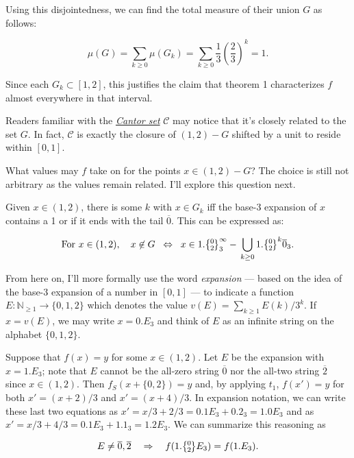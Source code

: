 \documentclass[20pt,]{extarticle}
\begin{document}
Using this disjointedness, we can find the total measure of their union
\(G\) as follows:

\[\mu(G) = \sum_{k \ge 0}\mu(G_k) = \sum_{k\ge 0}
\frac{1}{3}\left(\frac{2}{3}\right)^k = 1.\]

Since each \(G_k\subset [1,2]\), this justifies the claim that theorem 1
characterizes \(f\) almost everywhere in that interval.

\newcommand{\cantor}{\mathcal{C}}

Readers familiar with the
\href{https://en.wikipedia.org/wiki/Cantor_set}{\emph{Cantor set}}
\(\cantor\) may notice that it's closely related to the set \(G\). In
fact, \(\cantor\) is exactly the closure of \((1,2)-G\) shifted by a
unit to reside within \([0,1].\)

What values may \(f\) take on for the points \(x\in (1,2) - G\)? The
choice is still not arbitrary as the values remain related. I'll explore
this question next.

Given \(x\in (1,2)\), there is some \(k\) with \(x\in G_k\) iff the
base-3 expansion of \(x\) contains a 1 or if it ends with the tail
\(\overline{0}\). This can be expressed as:

\begin{equation}\text{For } x\in (1,2), \quad
  x\not\in G \;\;\Leftrightarrow\;\; x \in 1.\zerotwo^\infty_3 -\,
  \bigcup_{k\ge 0} 1.\zerotwo^k\overline{0}_3.\label{eq:onetwo_lessG}\end{equation}

From here on, I'll more formally use the word \emph{expansion} --- based
on the idea of the base-3 expansion of a number in \([0,1]\) --- to
indicate a function \(E:\mathbb{N}_{\ge 1}\to \{0, 1, 2\}\) which
denotes the value \(v(E) = \sum_{k\ge 1}E(k)/3^k.\) If \(x=v(E)\), we
may write \(x = 0.E_3\) and think of \(E\) as an infinite string on the
alphabet \(\{0,1,2\}\).

Suppose that \(f(x) = y\) for some \(x\in (1,2)\). Let \(E\) be the
expansion with \(x=1.E_3\); note that \(E\) cannot be the all-zero
string \(\overline 0\) nor the all-two string \(\overline 2\) since
\(x\in (1,2)\). Then \(f_S(x+\{0,2\}) = y\) and, by applying \(t_1\),
\(f(x') = y\) for both \(x' = (x+2)/3\) and \(x' = (x+4)/3\). In
expansion notation, we can write these last two equations as
\(x' = x/3 + 2/3 = 0.1E_3 + 0.2_3 = 1.0E_3\) and as
\(x' = x/3 + 4/3 = 0.1E_3 + 1.1_3 = 1.2E_3\). We can summarize this
reasoning as

\begin{equation}E\ne \overline 0, \overline 2 \quad\Rightarrow\quad
f(1.\zerotwo E_3) = f(1.E_3).\label{eq:h_reln}\end{equation}
\end{document}
